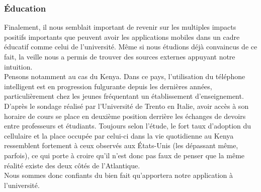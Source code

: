 		\subsubsection{Éducation}
		Finalement, il nous semblait important de revenir sur les multiples impacts positifs importants que peuvent avoir les applications mobiles dans un cadre éducatif comme celui de l'université. Même si nous étudions déjà convaincus de ce fait, la veille nous a permis de trouver des sources externes appuyant notre intuition. \\
		
		Pensons notamment au cas du Kenya. Dans ce pays, l'utilisation du téléphone intelligent est en progression fulgurante depuis les dernières années, particulièrement chez les jeunes fréquentant un établissement d'enseignement. D'après le sondage réalisé par l'Université de Trento en Italie, avoir accès à son horaire de cours se place en deuxième position derrière les échanges de devoirs entre professeurs et étudiants. Toujours selon l'étude, le fort taux d'adoption du cellulaire et la place occupée par celui-ci dans la vie quotidienne au Kenya ressemblent fortement à ceux observés aux États-Unis (les dépassant même, parfois), ce qui porte à croire qu'il n'est donc pas faux de penser que la même réalité existe des deux côtés de l'Atlantique. \\
		
		Nous sommes donc confiants du bien fait qu'apportera notre application à l'université. 
		
		
	
	
	
	
	
	
